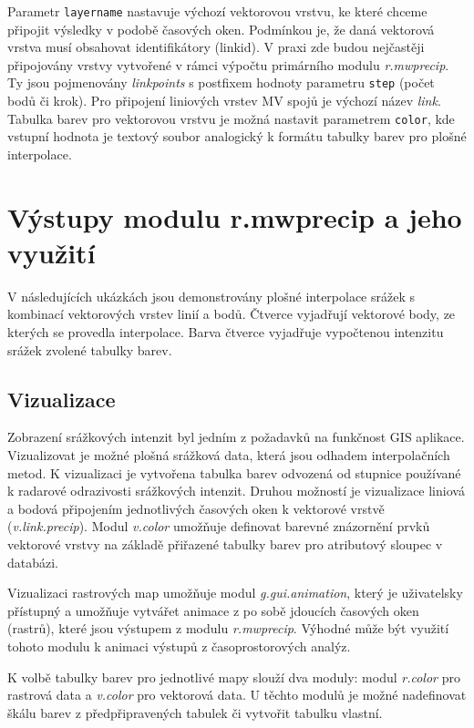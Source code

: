 \documentclass[a4paper,12pt,oneside]{report}
\begin{document}
Parametr \texttt{layername} nastavuje výchozí vektorovou vrstvu, ke
které chceme při\-pojit výsledky v podobě časových oken. Podmínkou je,
že daná vektorová vrstva musí obsahovat identifikátory (linkid). V
praxi zde budou nejčastěji připojovány vrstvy vytvořené v rámci
výpočtu primárního modulu \textit{r.mwprecip}. Ty jsou pojmenovány
\textit{linkpoints} s postfixem hodnoty parametru \texttt{step} (počet
bodů či krok). Pro připojení liniových vrstev MV spojů je výchozí
název \textit{link}.  Tabulka barev pro vektorovou vrstvu je možná
nastavit parametrem \texttt{color}, kde vstupní hodnota je textový
soubor analogický k formátu tabulky barev pro plošné interpolace.




\newpage
\setcounter{footnote}{1}
\section{Výstupy modulu r.mwprecip a jeho využití}
V následujících ukázkách jsou demonstrovány plošné interpolace srážek s kombinací
vektorových vrstev linií a bodů. Čtverce vyjadřují vektorové body, ze kterých se provedla
interpolace. Barva čtverce vyjadřuje vypočtenou intenzitu srážek zvolené tabulky
barev.


\subsection{Vizualizace}
Zobrazení srážkových intenzit byl jedním z požadavků na funkčnost GIS
aplikace. Vizualizovat je možné plošná srážková data, která jsou odhadem
interpolačních metod. K vizualizaci je vytvořena tabulka barev
odvozená od stupnice používané k radarové odrazivosti srážkových
intenzit. Druhou možností je vizualizace liniová a bodová připojením
jednotlivých časových oken k vektorové vrstvě
(\textit{v.link.precip}). Modul \textit{v.color} umožňuje definovat
barevné znázornění prvků vektorové vrstvy na základě přiřazené tabulky
barev pro atributový sloupec v databázi.

Vizualizaci rastrových map umožňuje modul \textit{g.gui.animation}, který je
 uživatelsky přístupný a umožňuje vytvářet animace z
po sobě jdoucích časových oken (rastrů), které jsou výstupem z modulu \textit{r.mwprecip}. 
Výhodné může být využití tohoto modulu k animaci výstupů z časoprostorových analýz.

K volbě tabulky barev pro jednotlivé mapy slouží dva moduly: modul \textit{r.color} pro rastrová data
a \textit{v.color} pro vektorová data. U těchto modulů je možné
nadefinovat škálu barev z předpřipravených tabulek či vytvořit
tabulku vlastní.
\end{document}
